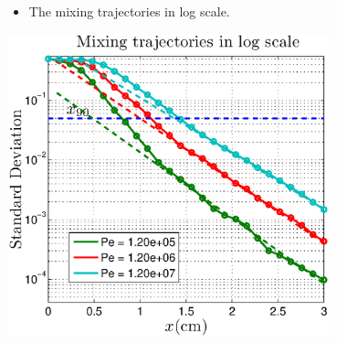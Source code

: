 \documentclass[12pt,t]{beamer}
\begin{document}

\begin{frame}
  \begin{itemize}
    \item The mixing trajectories in log scale.
  \end{itemize}
    \begin{center}   
     \includegraphics[width=0.7\textwidth]{example2veryPelog}
    \end{center}

\end{frame}
\end{document}
